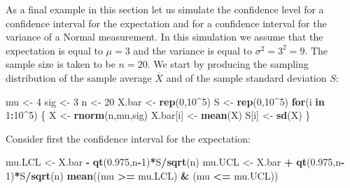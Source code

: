 \documentclass[]{krantz}
\makeatletter
\newenvironment{Shaded}{\begin{snugshade}}{\end{snugshade}}
\newcommand{\KeywordTok}[1]{\textcolor[rgb]{0.13,0.29,0.53}{\textbf{#1}}}
\newcommand{\DecValTok}[1]{\textcolor[rgb]{0.00,0.00,0.81}{#1}}
\newcommand{\FloatTok}[1]{\textcolor[rgb]{0.00,0.00,0.81}{#1}}
\newcommand{\StringTok}[1]{\textcolor[rgb]{0.31,0.60,0.02}{#1}}
\newcommand{\ControlFlowTok}[1]{\textcolor[rgb]{0.13,0.29,0.53}{\textbf{#1}}}
\newcommand{\OperatorTok}[1]{\textcolor[rgb]{0.81,0.36,0.00}{\textbf{#1}}}
\newcommand{\NormalTok}[1]{#1}
\newenvironment{kframe}{%
\medskip{}
\setlength{\fboxsep}{.8em}
 \def\at@end@of@kframe{}%
 \ifinner\ifhmode%
  \def\at@end@of@kframe{\end{minipage}}%
  \begin{minipage}{\columnwidth}%
 \fi\fi%
 \def\FrameCommand##1{\hskip\@totalleftmargin \hskip-\fboxsep
 \colorbox{shadecolor}{##1}\hskip-\fboxsep
     \hskip-\linewidth \hskip-\@totalleftmargin \hskip\columnwidth}%
 \MakeFramed {\advance\hsize-\width
   \@totalleftmargin\z@ \linewidth\hsize
   \@setminipage}}%
 {\par\unskip\endMakeFramed%
 \at@end@of@kframe}
\renewenvironment{Shaded}{\begin{kframe}}{\end{kframe}}
\theoremstyle{definition}
\theoremstyle{definition}
\theoremstyle{definition}
\theoremstyle{remark}
\makeatother
\begin{document}
As a final example in this section let us simulate the confidence level
for a confidence interval for the expectation and for a confidence
interval for the variance of a Normal measurement. In this simulation we
assume that the expectation is equal to \(\mu = 3\) and the variance is
equal to \(\sigma^2 = 3^2 = 9\). The sample size is taken to be
\(n=20\). We start by producing the sampling distribution of the sample
average \(\bar X\) and of the sample standard deviation \(S\):

\begin{Shaded}
\begin{Highlighting}[]
\NormalTok{mu <-}\StringTok{ }\DecValTok{4}
\NormalTok{sig <-}\StringTok{ }\DecValTok{3}
\NormalTok{n <-}\StringTok{ }\DecValTok{20}
\NormalTok{X.bar <-}\StringTok{ }\KeywordTok{rep}\NormalTok{(}\DecValTok{0}\NormalTok{,}\DecValTok{10}\OperatorTok{^}\DecValTok{5}\NormalTok{)}
\NormalTok{S <-}\StringTok{ }\KeywordTok{rep}\NormalTok{(}\DecValTok{0}\NormalTok{,}\DecValTok{10}\OperatorTok{^}\DecValTok{5}\NormalTok{)}
\ControlFlowTok{for}\NormalTok{(i }\ControlFlowTok{in} \DecValTok{1}\OperatorTok{:}\DecValTok{10}\OperatorTok{^}\DecValTok{5}\NormalTok{) \{}
\NormalTok{  X <-}\StringTok{ }\KeywordTok{rnorm}\NormalTok{(n,mu,sig)}
\NormalTok{  X.bar[i] <-}\StringTok{ }\KeywordTok{mean}\NormalTok{(X)}
\NormalTok{  S[i] <-}\StringTok{ }\KeywordTok{sd}\NormalTok{(X)}
\NormalTok{\}}
\end{Highlighting}
\end{Shaded}

Consider first the confidence interval for the expectation:

\begin{Shaded}
\begin{Highlighting}[]
\NormalTok{mu.LCL <-}\StringTok{ }\NormalTok{X.bar }\OperatorTok{-}\StringTok{ }\KeywordTok{qt}\NormalTok{(}\FloatTok{0.975}\NormalTok{,n}\OperatorTok{-}\DecValTok{1}\NormalTok{)}\OperatorTok{*}\NormalTok{S}\OperatorTok{/}\KeywordTok{sqrt}\NormalTok{(n)}
\NormalTok{mu.UCL <-}\StringTok{ }\NormalTok{X.bar }\OperatorTok{+}\StringTok{ }\KeywordTok{qt}\NormalTok{(}\FloatTok{0.975}\NormalTok{,n}\OperatorTok{-}\DecValTok{1}\NormalTok{)}\OperatorTok{*}\NormalTok{S}\OperatorTok{/}\KeywordTok{sqrt}\NormalTok{(n)}
\KeywordTok{mean}\NormalTok{((mu }\OperatorTok{>=}\StringTok{ }\NormalTok{mu.LCL) }\OperatorTok{&}\StringTok{ }\NormalTok{(mu }\OperatorTok{<=}\StringTok{ }\NormalTok{mu.UCL))}
\end{Highlighting}
\end{Shaded}
\end{document}
